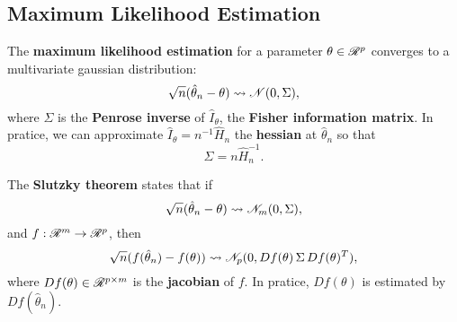 \documentclass[10pt]{article}
\begin{document}
\subsection{Maximum Likelihood Estimation}
\begin{outline}
  \1 The \textbf{maximum likelihood estimation} for a parameter $\theta \in \mathscr{R}^p$
  converges to a multivariate gaussian distribution:
  \begin{equation*}
    \sqrt{n}(\hat\theta_n - \theta) \leadsto \mathscr{N}(0,\Sigma),
  \end{equation*}
  where $\Sigma$ is the \textbf{Penrose inverse} of $\hat I_\theta$, the \textbf{Fisher
    information matrix}. In pratice, we can approximate $\hat I_\theta = n^{-1}\hat H_n$
  the \textbf{hessian} at $\hat\theta_n$ so that
  \begin{equation*}
    \Sigma = n\hat H_n^{-1}.
  \end{equation*}

  \1 The \textbf{Slutzky theorem} states that if 
  \begin{equation*}
    \sqrt{n}(\hat\theta_n - \theta) \leadsto \mathscr{N}_m(0,\Sigma),
  \end{equation*}
  and $f:\mathscr{R}^m\to\mathscr{R}^p$, then 
  \begin{equation*}
    \sqrt{n}(f(\hat\theta_n) - f(\theta)) \leadsto \mathscr{N}_p(0,Df(\theta)\,\Sigma\,Df(\theta)^T),
  \end{equation*}
  where $Df(\theta)\in\mathscr{R}^{p\times m}$ is the \textbf{jacobian} of $f$. In pratice,
  $Df(\theta)$ is estimated by $Df(\hat\theta_n)$.
\end{outline}
\end{document}
